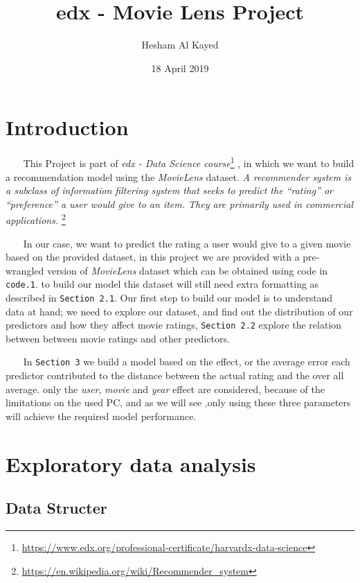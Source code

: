 \documentclass[]{article}
\title{edx - Movie Lens Project}
\author{Hesham Al Kayed}
\date{18 April 2019}
\let\rmarkdownfootnote\footnote%
\def\footnote{\protect\rmarkdownfootnote}
\begin{document}
\maketitle

\section{Introduction}\label{introduction}

~~~ This Project is part of \emph{edx - Data Science course}\footnote{\url{https://www.edx.org/professional-certificate/harvardx-data-science}}
, in which we want to build a recommendation model using the
\emph{MovieLens} dataset. \emph{A recommender system is a subclass of
information filtering system that seeks to predict the ``rating'' or
``preference'' a user would give to an item. They are primarily used in
commercial applications.} \footnote{\url{https://en.wikipedia.org/wiki/Recommender_system}}

~~~ In our case, we want to predict the rating a user would give to a
given movie based on the provided dataset, in this project we are
provided with a pre-wrangled version of \emph{MovieLens} dataset which
can be obtained using code in \texttt{code.1}. to build our model this
dataset will still need extra formatting as described in
\texttt{Section\ 2.1}. Our first step to build our model is to
understand data at hand; we need to explore our dataset, and find out
the distribution of our predictors and how they affect movie ratings,
\texttt{Section\ 2.2} explore the relation between between movie ratings
and other predictors.

~~~ In \texttt{Section\ 3} we build a model based on the effect, or the
average error each predictor contributed to the distance between the
actual rating and the over all average. only the \emph{user},
\emph{movie} and \emph{year} effect are considered, because of the
limitations on the used PC, and as we will see ,only using these three
parameters will achieve the required model performance.

\section{Exploratory data analysis}\label{exploratory-data-analysis}

\subsection{Data Structer}\label{data-structer}
\end{document}
